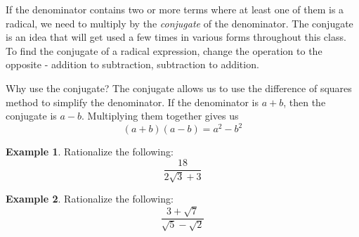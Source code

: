 \documentclass[addpoints,12pt]{exam}
\theoremstyle{definition}
\newtheorem{example}{Example}[subsection]
\begin{document}
If the denominator contains two or more terms where at least one of them is a radical, we need to multiply by the \emph{conjugate} of the denominator. The conjugate is an idea that will get used a few times in various forms throughout this class.
\vspace{.2in}
To find the conjugate of a radical expression, change the operation to the opposite - addition to subtraction, subtraction to addition. 

\vspace{.2in}
Why use the conjugate? The conjugate allows us to use the difference of squares method to simplify the denominator. If the denominator is $a + b$, then the conjugate is $a - b$. Multiplying them together gives us \[(a+b)(a-b) = a^2 - b^2\]

\begin{example}
Rationalize the following: \[\dfrac{18}{2\sqrt{3}+3}\]
\vspace{2in}
\end{example}

\begin{example}
Rationalize the following: \[\dfrac{3+\sqrt{7}}{\sqrt{5}-\sqrt{2}}\]
\vspace{2in}
\end{example}
\end{document}
